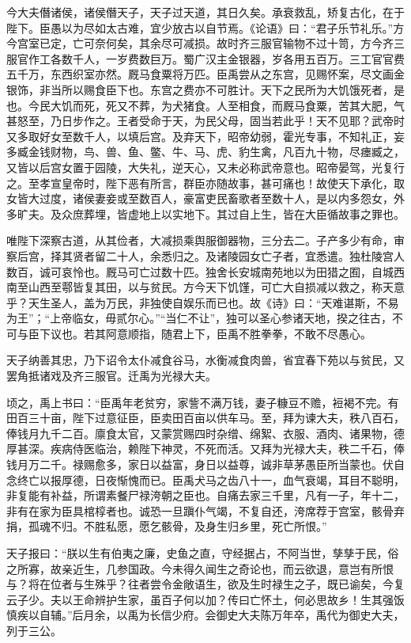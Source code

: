 \documentclass[12pt,UTF8]{ctexbook}
\begin{document}
今大夫僭诸侯，诸侯僭天子，天子过天道，其日久矣。承衰救乱，矫复古化，在于陛下。臣愚以为尽如太古难，宜少放古以自节焉。《论语》曰：“君子乐节礼乐。”方今宫室已定，亡可奈何矣，其余尽可减损。故时齐三服官输物不过十笥，方今齐三服官作工各数千人，一岁费数巨万。蜀广汉主金银器，岁各用五百万。三工官官费五千万，东西织室亦然。厩马食粟将万匹。臣禹尝从之东宫，见赐怀案，尽文画金银饰，非当所以赐食臣下也。东宫之费亦不可胜计。天下之民所为大饥饿死者，是也。今民大饥而死，死又不葬，为犬猪食。人至相食，而厩马食粟，苦其大肥，气甚怒至，乃日步作之。王者受命于天，为民父母，固当若此乎！天不见耶？武帝时又多取好女至数千人，以填后宫。及弃天下，昭帝幼弱，霍光专事，不知礼正，妄多臧金钱财物，鸟、兽、鱼、鳖、牛、马、虎、豹生禽，凡百九十物，尽瘗臧之，又皆以后宫女置于园陵，大失礼，逆天心，又未必称武帝意也。昭帝晏驾，光复行之。至孝宣皇帝时，陛下恶有所言，群臣亦随故事，甚可痛也！故使天下承化，取女皆大过度，诸侯妻妾或至数百人，豪富吏民畜歌者至数十人，是以内多怨女，外多旷夫。及众庶葬埋，皆虚地上以实地下。其过自上生，皆在大臣循故事之罪也。



唯陛下深察古道，从其俭者，大减损乘舆服御器物，三分去二。子产多少有命，审察后宫，择其贤者留二十人，余悉归之。及诸陵园女亡子者，宜悉遣。独杜陵宫人数百，诚可哀怜也。厩马可亡过数十匹。独舍长安城南苑地以为田猎之囿，自城西南至山西至鄠皆复其田，以与贫民。方今天下饥馑，可亡大自损减以救之，称天意乎？天生圣人，盖为万民，非独使自娱乐而已也。故《诗》曰：“天难谌斯，不易为王”；“上帝临女，毋贰尔心。”“当仁不让”，独可以圣心参诸天地，揆之往古，不可与臣下议也。若其阿意顺指，随君上下，臣禹不胜拳拳，不敢不尽愚心。



天子纳善其忠，乃下诏令太仆减食谷马，水衡减食肉兽，省宜春下苑以与贫民，又罢角抵诸戏及齐三服官。迁禹为光禄大夫。



顷之，禹上书曰：“臣禹年老贫穷，家訾不满万钱，妻子糠豆不赡，裋褐不完。有田百三十亩，陛下过意征臣，臣卖田百亩以供车马。至，拜为谏大夫，秩八百石，俸钱月九千二百。廪食太官，又蒙赏赐四时杂缯、绵絮、衣服、酒肉、诸果物，德厚甚深。疾病侍医临治，赖陛下神灵，不死而活。又拜为光禄大夫，秩二千石，俸钱月万二千。禄赐愈多，家日以益富，身日以益尊，诚非草茅愚臣所当蒙也。伏自念终亡以报厚德，日夜惭愧而已。臣禹犬马之齿八十一，血气衰竭，耳目不聪明，非复能有补益，所谓素餐尸禄洿朝之臣也。自痛去家三千里，凡有一子，年十二，非有在家为臣具棺椁者也。诚恐一旦蹎仆气竭，不复自还，洿席荐于宫室，骸骨弃捐，孤魂不归。不胜私愿，愿乞骸骨，及身生归乡里，死亡所恨。”



天子报曰：“朕以生有伯夷之廉，史鱼之直，守经据占，不阿当世，孳孳于民，俗之所寡，故亲近生，几参国政。今未得久闻生之奇论也，而云欲退，意岂有所恨与？将在位者与生殊乎？往者尝令金敞语生，欲及生时禄生之子，既已谕矣，今复云子少。夫以王命辨护生家，虽百子何以加？传曰亡怀土，何必思故乡！生其强饭慎疾以自辅。”后月余，以禹为长信少府。会御史大夫陈万年卒，禹代为御史大夫，列于三公。
\end{document}
